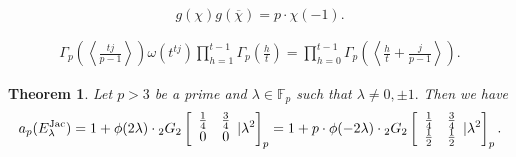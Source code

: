 \documentclass[10pt,a4paper]{amsart}
\newtheorem{theorem}{Theorem}
\newcommand{\jac}{\text{{\rm{Jac}}}}
\begin{document}
\begin{equation}\label{inverse}
    g(\chi)g(\overline{\chi})=
        p\cdot\chi(-1). 
        \end{equation}

\begin{align}\label{prod-3}
   \Gamma_p\left(\left\langle\frac{tj}{p-1}\right\rangle\right)\omega(t^{tj}) \prod\limits_{h=1}^{t-1}\Gamma_p\left(\frac{h}{t}\right)=\prod\limits_{h=0}^{t-1}\Gamma_p\left(\left\langle\frac{h}{t}+\frac{j}{p-1}\right\rangle\right).
\end{align}

	\begin{theorem}\label{theorem-Jacobi}
	Let $p>3$ be a prime and $\lambda\in \mathbb{F}_p$ such that $\lambda\neq0, \pm 1.$ Then we have 
	$$ 
	a_p(E^{\jac}_{\lambda})=1+\phi(2\lambda) \cdot{_2G_2}\left[\begin{array}{cc}
\frac{1}{4}   & \frac{3}{4} \\
  0    & 0  \end{array}|{\lambda^2}\right]_p=1+p\cdot\phi(-2\lambda)\cdot {_2G_2}\left[\begin{array}{cc}
\frac{1}{4}   & \frac{3}{4} \\
  \frac{1}{2}    & \frac{1}{2}  \end{array}|{\lambda^2}\right]_p.$$
\end{theorem}
\end{document}
